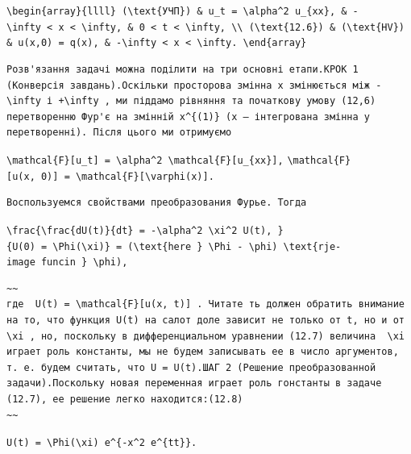 \documentclass[
  ukrainian,
]{article}
\begin{document}
\texttt{\textbackslash{}begin\{array\}\{llll\}\ (\textbackslash{}text\{УЧП\})\ \&\ u\_t\ =\ \textbackslash{}alpha\^{}2\ u\_\{xx\},\ \&\ -\textbackslash{}infty\ \textless{}\ x\ \textless{}\ \textbackslash{}infty,\ \&\ 0\ \textless{}\ t\ \textless{}\ \textbackslash{}infty,\ \textbackslash{}\textbackslash{}\ (\textbackslash{}text\{12.6\})\ \&\ (\textbackslash{}text\{HV\})\ \&\ u(x,0)\ =\ q(x),\ \&\ -\textbackslash{}infty\ \textless{}\ x\ \textless{}\ \textbackslash{}infty.\ \textbackslash{}end\{array\}}

\begin{verbatim}
Розв'язання задачі можна поділити на три основні етапи.КРОК 1 (Конверсія завдань).Оскільки просторова змінна x змінюється між -\infty і +\infty , ми піддамо рівняння та початкову умову (12,6) перетворенню Фур'є на змінній x^{(1)} (x — інтегрована змінна у перетворенні). Після цього ми отримуємо
\end{verbatim}

\texttt{\textbackslash{}mathcal\{F\}{[}u\_t{]}\ =\ \textbackslash{}alpha\^{}2\ \textbackslash{}mathcal\{F\}{[}u\_\{xx\}{]},}
\texttt{\textbackslash{}mathcal\{F\}{[}u(x,\ 0){]}\ =\ \textbackslash{}mathcal\{F\}{[}\textbackslash{}varphi(x){]}.}

\begin{verbatim}
Воспользуемся свойствами преобразования Фурье. Тогда
\end{verbatim}

\texttt{\textbackslash{}frac\{\textbackslash{}frac\{dU(t)\}\{dt\}\ =\ -\textbackslash{}alpha\^{}2\ \textbackslash{}xi\^{}2\ U(t),\ \}\{U(0)\ =\ \textbackslash{}Phi(\textbackslash{}xi)\}\ =\ (\textbackslash{}text\{here\ \}\ \textbackslash{}Phi\ -\ \textbackslash{}phi)\ \textbackslash{}text\{rje-image\ funcin\ \}\ \textbackslash{}phi),}

\begin{verbatim}
~~
где  U(t) = \mathcal{F}[u(x, t)] . Читате ть должен обратить внимание на то, что функция U(t) на салот доле зависит не только от t, но и от  \xi , но, поскольку в дифференциальном уравнении (12.7) величина  \xi  играет роль константы, мы не будем записывать ее в число аргументов, т. е. будем считать, что U = U(t).ШАГ 2 (Решение преобразованной задачи).Поскольку новая переменная играет роль гонстанты в задаче (12.7), ее решение легко находится:(12.8)
~~
\end{verbatim}

\texttt{U(t)\ =\ \textbackslash{}Phi(\textbackslash{}xi)\ e\^{}\{-x\^{}2\ e\^{}\{tt\}\}.}
\end{document}
